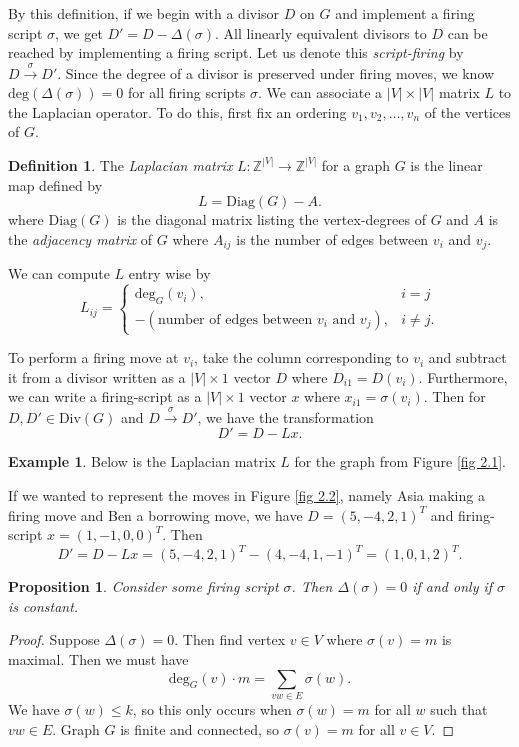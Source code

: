 \documentclass[openany, amssymb, psamsfonts]{amsart}
\newtheorem{prop}{Proposition}[section]
\theoremstyle{definition}
\newtheorem{defn}{Definition}[section]
\newtheorem{exmp}{Example}[section]
\numberwithin{equation}{section}
\begin{document}
By this definition, if we begin with a divisor $D$ on $G$ and implement a firing script $\sigma$, we get $D'=D-\Delta(\sigma)$. All linearly equivalent divisors to $D$ can be reached by implementing a firing script. Let us denote this \textit{script-firing} by $D\xrightarrow{\sigma} D'$. Since the degree of a divisor is preserved under firing moves, we know $\text{deg}(\Delta(\sigma))=0$ for all firing scripts $\sigma$. We can associate a $|V|\times |V|$ matrix $L$ to the Laplacian operator. To do this, first fix an ordering $v_1, v_2,\dots,v_n$ of the vertices of $G$.

\begin{defn}
\label{defn 4.3}
The \textit{Laplacian matrix} $L:\mathbb{Z}^{|V|}\rightarrow \mathbb{Z}^{|V|}$ for a graph $G$ is the linear map defined by
\[L=\text{Diag}(G)-A.\]
where $\text{Diag}(G)$ is the diagonal matrix listing the vertex-degrees of $G$ and $A$ is the \textit{adjacency matrix} of $G$ where $A_{ij}$ is the number of edges between $v_i$ and $v_j$.
\end{defn}
We can compute $L$ entry wise by 
\[L_{ij}=
\begin{cases}
    \text{deg}_G(v_i), & i=j\\
    -(\text{number of edges between }v_i\text{ and }v_j), & i\neq j.
\end{cases}
\]

To perform a firing move at $v_i$, take the column corresponding to $v_i$ and subtract it from a divisor written as a $|V|\times 1$ vector $D$ where $D_{i1}=D(v_i)$. Furthermore, we can write a firing-script as a $|V|\times 1$ vector $x$ where $x_{i1}=\sigma(v_i)$. Then for $D, D'\in \text{Div}(G)$ and $D\xrightarrow{\sigma} D'$, we have the transformation
\[D'=D-Lx.\]

\begin{exmp}
Below is the Laplacian matrix $L$ for the graph from Figure \ref{fig 2.1}.
\begin{center}
    
\end{center}
If we wanted to represent the moves in Figure \ref{fig 2.2}, namely Asia making a firing move and Ben a borrowing move, we have $D=(5,-4,2,1)^T$ and firing-script $x=(1,-1,0,0)^T$. Then 
\[D'=D-Lx=(5,-4,2,1)^T-(4,-4,1,-1)^T=(1,0,1,2)^T.\]
\end{exmp}

\begin{prop}
\label{prop 4.1}
Consider some firing script $\sigma$. Then $\Delta(\sigma)=0$ if and only if $\sigma$ is constant. 
\end{prop}
\begin{proof}
Suppose $\Delta(\sigma)=0$. Then find vertex $v\in V$ where $\sigma(v)=m$ is maximal. Then we must have 
\[\text{deg}_G(v)\cdot m=\sum_{vw\in E}\sigma(w).\]
We have $\sigma(w)\leq k$, so this only occurs when $\sigma(w)=m$ for all $w$ such that $vw\in E$. Graph $G$ is finite and connected, so $\sigma(v)=m$ for all $v\in V$.
\end{proof}
\end{document}
